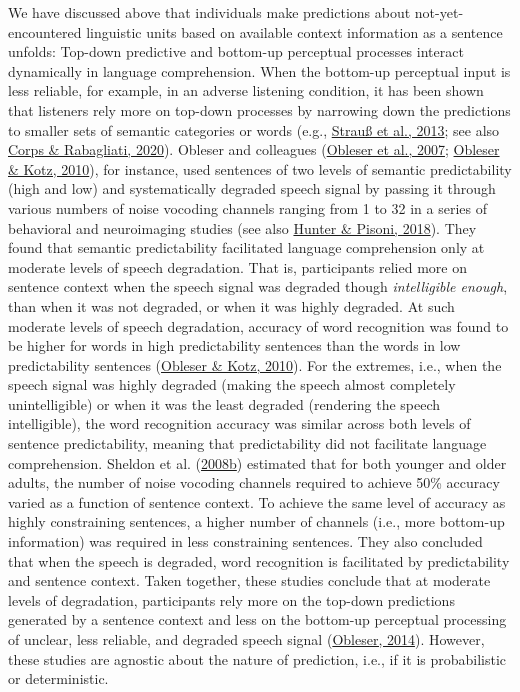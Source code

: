 \documentclass[a4paper, nobind]{templates/ociamthesis}
\begin{document}
We have discussed above that individuals make predictions about not-yet-encountered linguistic units based on available context information as a sentence unfolds:
Top-down predictive and bottom-up perceptual processes interact dynamically in language comprehension.
When the bottom-up perceptual input is less reliable, for example, in an adverse listening condition, it has been shown that listeners rely more on top-down processes by narrowing down the predictions to smaller sets of semantic categories or words (e.g., \protect\hyperlink{ref-Strauss2013}{Strauß et al., 2013}; see also \protect\hyperlink{ref-Corps2020}{Corps \& Rabagliati, 2020}).
Obleser and colleagues (\protect\hyperlink{ref-Obleser2007}{Obleser et al., 2007}; \protect\hyperlink{ref-Obleser2010}{Obleser \& Kotz, 2010}), for instance, used sentences of two levels of semantic predictability (high and low) and systematically degraded speech signal by passing it through various numbers of noise vocoding channels ranging from 1 to 32 in a series of behavioral and neuroimaging studies (see also \protect\hyperlink{ref-Hunter2018}{Hunter \& Pisoni, 2018}).
They found that semantic predictability facilitated language comprehension only at moderate levels of speech degradation.
That is, participants relied more on sentence context when the speech signal was degraded though \emph{intelligible enough}, than when it was not degraded, or when it was highly degraded.
At such moderate levels of speech degradation, accuracy of word recognition was found to be higher for words in high predictability sentences than the words in low predictability sentences (\protect\hyperlink{ref-Obleser2010}{Obleser \& Kotz, 2010}).
For the extremes, i.e., when the speech signal was highly degraded (making the speech almost completely unintelligible) or when it was the least degraded (rendering the speech intelligible),
the word recognition accuracy was similar across both levels of sentence predictability, meaning that predictability did not facilitate language comprehension.
Sheldon et al. (\protect\hyperlink{ref-Sheldon2008b}{2008b}) estimated that for both younger and older adults, the number of noise vocoding channels required to achieve 50\% accuracy varied as a function of sentence context.
To achieve the same level of accuracy as highly constraining sentences, a higher number of channels (i.e., more bottom-up information) was required in less constraining sentences.
They also concluded that when the speech is degraded, word recognition is facilitated by predictability and sentence context.
Taken together, these studies conclude that at moderate levels of degradation, participants rely more on the top-down predictions generated by a sentence context and less on the bottom-up perceptual processing of unclear, less reliable, and degraded speech signal (\protect\hyperlink{ref-Obleser2014}{Obleser, 2014}).
However, these studies are agnostic about the nature of prediction, i.e., if it is probabilistic or deterministic.
\end{document}
